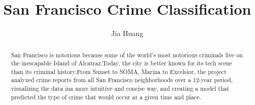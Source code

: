 \documentclass{amsart}
\begin{document}
%
%
\title[A Short Running Title]{ San Francisco Crime Classification}%

\author{Jia Huang}
\address[A.~1]{School of Computer Science,\\ 
Xi'an Shiyou University, Shaanxi 710065, China}%


%
%
\date{\gitAuthorDate}%

\begin{abstract}
    San Francisco is notorious because some of the world's most notorious
    criminals live on the inescapable Island of Alcatraz.Today, the city 
    is better known for its tech scene than its criminal history.From 
    Sunset to SOMA, Marina to Excelsior, the project analyzed crime reports 
    from all San Francisco neighborhoods over a 12-year period, visualizing 
    the data ina more intuitive and concise way, and creating a model 
    that predicted the type of crime that would occur at a given time
    and place.
\end{abstract}

\maketitle
\tableofcontents

\newpage



\newpage




\listoftodos
\end{document}
